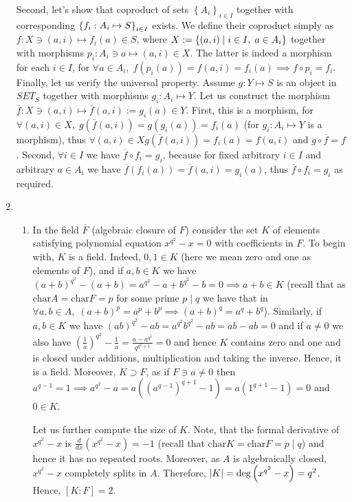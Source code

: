 \documentclass[8pt]{article} %
\begin{document}
\begin{enumerate}[label=\bfseries Problem \arabic*.]
{		Second, let's show that coproduct of sets $\left\{A_i\right\}_{i\in I}$ 
		together with corresponding $\left\{f_i:A_i\mapsto S\right\}_{i\in I}$ exists. We define their coproduct simply as
		$f:X\ni(a,i)\mapsto f_i(a)\in S$, where $X:=\left\{(a,i)\mid i\in I,\;a\in A_i\right\}$ together with morphisms 
		$p_i:A_i\ni a\mapsto (a,i)\in X$. The latter is indeed a morphism for each $i\in I$, for $\forall a\in A_i,\;
		f(p_i(a))=f(a,i)=f_i(a)\implies f\circ p_i=f_i$. Finally, let us verify the universal property. Assume
		$g:Y\mapsto S$ is an object in $SET_S$ together with morphisms $g_i:A_i\mapsto Y$. Let us construct the morphism
		$\overline{f}:X\ni (a,i)\mapsto \overline{f}(a,i):=g_i(a)\in Y$. First, this is a morphism, for $\forall (a,i)\in X,\;
		g(\overline{f}(a,i))=g(g_i(a))=f_i(a)$ (for $g_i:A_i\mapsto Y$ is a morphism), thus $\forall (a,i)\in X
		g(\overline{f}(a,i))=f_i(a)=f(a,i)$ and $g\circ\overline{f}=f$. Second, $\forall i\in I$ we have $\overline{f}\circ
		f_i=g_i$, because for fixed arbitrary $i\in I$ and arbitrary $a\in A_i$ we have $\overline{f}(f_i(a))=\overline{f}(a,i
		)=g_i(a)$, thus $\overline{f}\circ f_i=g_i$ as required.
		}
	\item{\begin{enumerate}[label=(\arabic*).]
				\renewcommand{\char}{\mbox{char}}
				\renewcommand{\deg}{\mbox{deg}}
			\item{In the field $\overline{F}$ (algebraic closure of $F$) consider the set $K$ of elements satisfying polynomial equation
				$x^{q^2}-x=0$ with coefficients in $F$. To begin with, $K$ is a field. Indeed, $0,1\in K$
				(here we mean zero and one as elements of $F$), and if $a,b\in K$ we have
				$(a+b)^{q^2}-(a+b)=a^{q^2}-a+b^{q^2}-b=0\implies a+b\in K$ (recall that as $\char A=\char F=p$ for some
				prime $p\mid q$
				we have that in $\forall a,b\in A,\;(a+b)^p=a^p+b^p\implies (a+b)^q=a^q+b^q$). Similarly, if $a,b\in K$
				we have $(ab)^{q^2}-ab=a^{q^2}b^{q^2}-ab=ab-ab=0$ and if $a\neq 0$ we also have $\left(\frac{1}{a}\right)
				^{q^2}-\frac{1}{a}
				=\frac{a-a^{q^2}}{q^{q^2+1}}=0$ and hence $K$ contains zero and one and is closed under additions, multiplication
				and taking the inverse. Hence, it is a field. Moreover, $K\supset F$, as if $F\ni a\neq 0$ then $a^{q-1}=1\implies
				a^{q^2}-a=a(\left(a^{q-1}\right)^{q+1}-1)=a(1^{q+1}-1)=0$ and $0\in K$.

				Let us further compute the size of $K$. Note, that the formal derivative of $x^{q^2}-x$ is
				$\frac{d}{dx}(x^{q^2}-x)=-1$ (recall that $\char K=\char F=p\mid q$) and hence it has no repeated roots. Moreover,
				as $A$ is algebraically closed, $x^{q^2}-x$ completely splits in $A$.
				Therefore, $\myabs{K}= \deg\left(x^{q^2}-x\right)=q^2$. Hence, $[K:F]=2$.

}
\end{enumerate}}
\end{enumerate}
\end{document}

